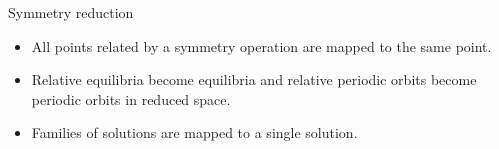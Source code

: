 \documentclass{beamer}
\begin{document}
\begin{frame}{Symmetry reduction}
\begin{itemize}
 \item All points related by a symmetry operation are mapped to the same point.
 \item Relative equilibria become equilibria and relative periodic orbits become periodic orbits in reduced space.
 \item Families of solutions are mapped to a single solution.
\end{itemize}
\end{frame}


% 
% 
% 
% 
% 
\end{document}
